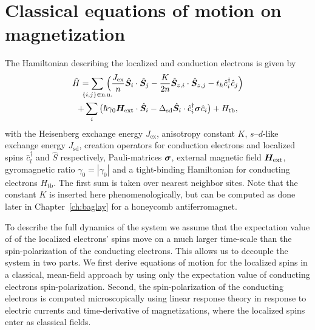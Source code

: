 \section{Classical equations of motion on magnetization}\label{cd:sd:motion}
The Hamiltonian describing the localized and conduction electrons is given by
\begin{multline}
    \hat{H}
        = \sum_{\mathclap{\{i,j\}\in\text{n.n.}}}\,\Big(\frac{J_{\text{ex}}}{n}\hat{\bb{S}}_i\cdot\hat{\bb{S}}_j - \frac{K}{2n}\hat{\bb{S}}_{z,i}\cdot\hat{\bb{S}}_{z,j}-t_h \hat{c}_i^\dagger\hat{c}_j
        \Big)\\+\sum_i \big(\hslash\gamma_0\bb{H}_\text{ext}\cdot\hat{\bb{S}}_i-\Delta_\text{sd}\hat{\bb{S}}_i\cdot\hat{c}_i^\dagger\bb{\sigma}\hat{c}_i\big)+H_\text{tb},
    \label{intro:eq:Hm}%
\end{multline}
with the Heisenberg exchange energy $J_{\text{ex}}$, anisotropy constant $K$, $s$--$d$-like exchange energy $J_{\text{sd}}$, creation operators for conduction electrons and localized spins $\hat{c}^\dagger_l$ and $\hat{S}$ respectively, Pauli-matrices $\boldsymbol{\sigma}$, external magnetic field $\boldsymbol{H}_\text{ext}$, gyromagnetic ratio $\gamma_0=|\gamma_0|$ and a tight-binding Hamiltonian for conducting electrons $H_\text{tb}$.  The first sum is taken over nearest neighbor sites. Note that the constant $K$ is inserted here phenomenologically, but can be computed as done later in Chapter~\ref{ch:baglay} for a honeycomb antiferromagnet.

To describe the full dynamics of the system we assume that the expectation value of of the localized electrons' spins move on a much larger time-scale than the spin-polarization of the conducting electrons. This allows us to decouple the system in two parts. We first derive equations of motion for the localized spins in a classical, mean-field approach by using only the expectation value of conducting electrons spin-polarization. Second, the spin-polarization of the conducting electrons is computed microscopically using linear response theory in response to electric currents and time-derivative of magnetizations, where the localized spins enter as classical fields. 

